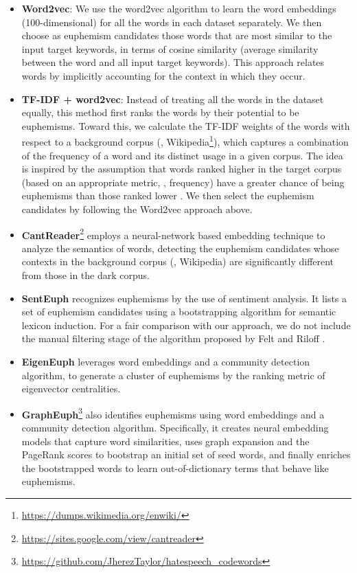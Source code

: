 \begin{itemize}%
	\item \textbf{Word2vec}: We use the word2vec algorithm \cite{mikolov2013distributed,mikolov2013efficient}  to learn the word embeddings (100-dimensional) for all the words in each dataset separately. We then choose as euphemism candidates those words that are most similar to the input target keywords, in terms of cosine similarity (average similarity between the word and all input target keywords). 
	This approach relates words by implicitly accounting for the context in which they occur. 
	\item \textbf{TF-IDF + word2vec}: Instead of treating all the words in the dataset equally, this method first ranks the words by their potential to be euphemisms. Toward this, we calculate the TF-IDF weights of the words \cite{manning2008introduction} with respect to a background corpus (\ie, Wikipedia\footnote{\url{https://dumps.wikimedia.org/enwiki/}}), which captures a combination of the frequency of a word and its distinct usage in a given corpus. The idea is inspired by the assumption that words ranked higher in the target corpus (based on an appropriate metric, \eg, frequency) have a greater chance of being euphemisms than those ranked lower \cite{magu2018determining}.  We then select the euphemism candidates by following the Word2vec approach above.  
	\item \textbf{CantReader}\footnote{\url{https://sites.google.com/view/cantreader}} \cite{yuan2018reading} employs a neural-network based embedding technique to analyze the semantics of words, detecting the euphemism candidates whose contexts in the background corpus (\eg, Wikipedia) are significantly different from those in the dark corpus. 
	\item \textbf{SentEuph} \cite{felt2020recognizing} recognizes euphemisms by the use of sentiment analysis. It lists a set of euphemism candidates using a bootstrapping algorithm for semantic lexicon induction. For a fair comparison with our approach, we do not include the manual filtering stage of the algorithm proposed by Felt and Riloff \cite{felt2020recognizing}. 
	\item \textbf{EigenEuph} \cite{magu2018determining} leverages word embeddings and a community detection algorithm, to generate a cluster of euphemisms by the ranking metric of eigenvector centralities. %
	\item \textbf{GraphEuph}\footnote{\url{https://github.com/JherezTaylor/hatespeech_codewords}} \cite{taylor2017surfacing} also identifies euphemisms using word embeddings and a community detection algorithm. Specifically, it creates neural embedding models that capture word similarities, uses graph expansion and the PageRank scores \cite{page1999pagerank} to bootstrap an initial set of seed words, and finally enriches the bootstrapped words to learn out-of-dictionary terms that behave like euphemisms. 

\end{itemize}
